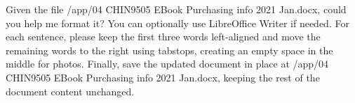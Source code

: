 \begin{instructionbox}
Given the file \textasciigrave{}/app/04 CHIN9505 EBook Purchasing info 2021 Jan.docx\textasciigrave{}, could you help me format it? You can optionally use LibreOffice Writer if needed. For each sentence, please keep the first three words left-aligned and move the remaining words to the right using tabstops, creating an empty space in the middle for photos. Finally, save the updated document in place at \textasciigrave{}/app/04 CHIN9505 EBook Purchasing info 2021 Jan.docx\textasciigrave{}, keeping the rest of the document content unchanged.
\end{instructionbox}


